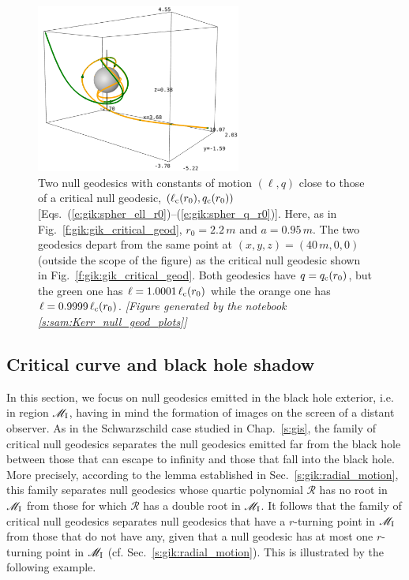 \begin{figure}
\centerline{\includegraphics[width=0.6\textwidth]{gik_close_critical.png}}
\caption[]{\label{f:gik:close_critical} \footnotesize
Two null geodesics with constants of motion $(\ell,q)$ close
to those of a critical null
geodesic, $(\ell_{\rm c}(r_0),q_{\rm c}(r_0))$
[Eqs.~(\ref{e:gik:spher_ell_r0})--(\ref{e:gik:spher_q_r0})]. Here,
as in Fig.~\ref{f:gik:gik_critical_geod}, $r_0=2.2\, m$ and $a=0.95\, m$.
The two geodesics depart from the
same point at $(x,y,z)=(40\, m, 0, 0)$ (outside the scope of the figure)
as the critical null geodesic shown in Fig.~\ref{f:gik:gik_critical_geod}.
Both geodesics have $q = q_{\rm c}(r_0)$, but the green one
has $\ell = 1.0001\,\ell_{\rm c}(r_0)$
while the orange one has $\ell = 0.9999\,\ell_{\rm c}(r_0)$.
\textsl{[Figure generated by the notebook \ref{s:sam:Kerr_null_geod_plots}]}
}
\end{figure}



\subsection{Critical curve and black hole shadow} \label{s:gik:shadow_generic}

In this section, we focus on null geodesics emitted in the black hole
exterior, i.e. in region $\mathscr{M}_{\rm I}$, having in mind the formation
of images on the screen of a distant observer.
As in the Schwarzschild case studied in Chap.~\ref{s:gis}, the family
of critical null geodesics separates the null geodesics emitted far from the
black hole between those
that can escape to infinity and those that fall into the black hole.
More precisely, according to the lemma established in Sec.~\ref{s:gik:radial_motion},
this family separates null geodesics whose quartic polynomial $\mathscr{R}$
has no root in $\mathscr{M}_{\rm I}$ from those for which $\mathscr{R}$ has a double
root in $\mathscr{M}_{\rm I}$. It follows that the family of critical null
geodesics separates null geodesics that have a $r$-turning
point in $\mathscr{M}_{\rm I}$ from those that do not have any, given that a null geodesic has at most
one $r$-turning point in $\mathscr{M}_{\rm I}$ (cf. Sec.~\ref{s:gik:radial_motion}).
This is illustrated by the following example.

